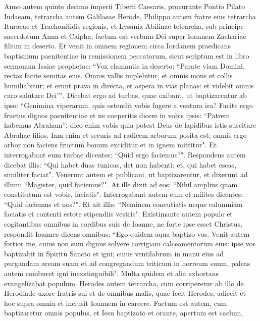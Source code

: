 \begin{biblechapter}  
\verse Anno autem quinto decimo imperii Tiberii Caesaris, procurante Pontio Pilato Iudaeam, tetrarcha autem Galilaeae Herode, Philippo autem fratre eius tetrarcha Ituraeae et Trachonitidis regionis, et Lysania Abilinae tetrarcha,  
\verse sub principe sacerdotum Anna et Caipha, factum est verbum Dei super Ioannem Zachariae filium in deserto. 
\verse Et venit in omnem regionem circa Iordanem praedicans baptismum paenitentiae in remissionem peccatorum, 
\verse sicut scriptum est in libro sermonum Isaiae prophetae: “Vox clamantis in deserto: “Parate viam Domini, rectas facite semitas eius. 
\verse Omnis vallis implebitur, et omnis mons et collis humiliabitur; et erunt prava in directa, et aspera in vias planas: 
\verse et videbit omnis caro salutare Dei”". 
\verse Dicebat ergo ad turbas, quae exibant, ut baptizarentur ab ipso: “Genimina viperarum, quis ostendit vobis fugere a ventura ira? 
\verse Facite ergo fructus dignos paenitentiae et ne coeperitis dicere in vobis ipsis: “Patrem habemus Abraham”; dico enim vobis quia potest Deus de lapidibus istis suscitare Abrahae filios. 
\verse Iam enim et securis ad radicem arborum posita est; omnis ergo arbor non faciens fructum bonum exciditur et in ignem mittitur". 
\verse Et interrogabant eum turbae dicentes: “Quid ergo faciemus?". 
\verse Respondens autem dicebat illis: “Qui habet duas tunicas, det non habenti; et, qui habet escas, similiter faciat". 
\verse Venerunt autem et publicani, ut baptizarentur, et dixerunt ad illum: “Magister, quid faciemus?". 
\verse At ille dixit ad eos: “Nihil amplius quam constitutum est vobis, faciatis". 
\verse Interrogabant autem eum et milites dicentes: “Quid faciemus et nos?". Et ait illis: “Neminem concutiatis neque calumniam faciatis et contenti estote stipendiis vestris". 
\verse Existimante autem populo et cogitantibus omnibus in cordibus suis de Ioanne, ne forte ipse esset Christus, 
\verse respondit Ioannes dicens omnibus: “Ego quidem aqua baptizo vos. Venit autem fortior me, cuius non sum dignus solvere corrigiam calceamentorum eius: ipse vos baptizabit in Spiritu Sancto et igni;  
\verse cuius ventilabrum in manu eius ad purgandam aream suam et ad congregandum triticum in horreum suum, paleas autem comburet igni inexstinguibili". 
\verse Multa quidem et alia exhortans evangelizabat populum. 
\verse Herodes autem tetrarcha, cum corriperetur ab illo de Herodiade uxore fratris sui et de omnibus malis, quae fecit Herodes, 
\verse adiecit et hoc supra omnia et inclusit Ioannem in carcere. 
\verse Factum est autem, cum baptizaretur omnis populus, et Iesu baptizato et orante, apertum est caelum, 

\end{biblechapter}
